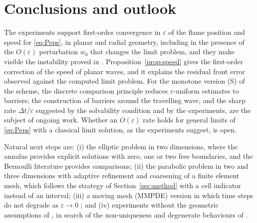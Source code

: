 \documentclass[11pt]{amsart}
\theoremstyle{remark}
\newcommand{\ve}{\varepsilon}
\begin{document}
\section{Conclusions and outlook}
The experiments support first-order convergence in $\ve$ of the flame
position and speed for \eqref{eq:Peps}, in planar and radial geometry,
including in the presence of the $O(\ve)$ perturbation $w_0$ that changes the
limit problem, and they make visible the instability proved in
\cite{FernandezBonderWolanski2000}. Proposition~\ref{prop:speed} gives the
first-order correction of the speed of planar waves, and it explains the
residual front error observed against the computed limit problem. For the
monotone version (S) of the scheme, the discrete comparison principle reduces
$\ve$-uniform estimates to barriers; the construction of barriers around the
travelling wave, and the sharp rate $\Delta t/\ve$ suggested by the
solvability condition and by the experiments, are the subject of ongoing work.
Whether an $O(\ve)$ rate holds for general limits of \eqref{eq:Peps} with a
classical limit solution, as the experiments suggest, is open.

Natural next steps are: (i) the elliptic problem in two dimensions, where the
annulus provides explicit solutions with zero, one or two free boundaries, and
the Bernoulli literature \cite{FlucherRumpf1997,ShenDaiHuang2024} provides
comparisons; (ii) the parabolic problem in two and three dimensions with
adaptive refinement and coarsening of a finite element mesh, which follows
the strategy of Section~\ref{sec:method} with a cell indicator instead of an
interval; (iii) a moving mesh (MMPDE) version in which time steps do not
degrade as $\ve\to0$ \cite{HuangRussell2011,BuddHuangRussell2009}; and
(iv) experiments without the geometric assumptions of
\cite{FernandezBonderWolanski2004}, in search of the non-uniqueness and
degenerate behaviours of \cite{PetrosyanYip2008,WeissZhang2009}.



\end{document}
